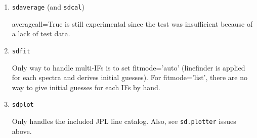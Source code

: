 \begin{enumerate}
\item {\tt sdaverage} (and {\tt sdcal})

  averageall=True is still experimental since the test was insufficient 
  because of a lack of test data.

% 

\item {\tt sdfit}

%
Only way to handle multi-IFs is to set fitmode='auto'
(linefinder is applied for each spectra and derives initial guesses).
For fitmode='list', there are no way to give initial guesses for each IFs by hand.

\item {\tt sdplot}

  Only handles the included JPL line catalog.  Also, see {\tt sd.plotter} issues above.

%

\end{enumerate}


